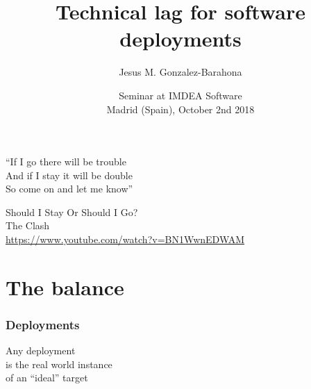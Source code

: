 \documentclass[17pt,aspectratio=169,hyperref=pdfusetitle]{beamer}
\title[Technical lag]{Technical lag for software deployments}
\author[Jesus M. Gonzalez-Barahona]{Jesus M. Gonzalez-Barahona}
\institute[URJC]{Universidad Rey Juan Carlos \\
  @jgbarah ~~~~~ \url{http://github.com/jgbarah/presentations}}
\date[Seminar IMDEA Software ]{Seminar at IMDEA Software \\ Madrid (Spain), October 2nd 2018}
\begin{document}
\begin{frame}
  \maketitle
\end{frame}


\begin{frame}

  {\em
    \begin{center}
      ``If I go there will be trouble \\
      And if I stay it will be double \\
      So come on and let me know''\\
    \end{center}
    \begin{flushright}
      Should I Stay Or Should I Go? \\
      The Clash \\
      \vspace{1cm}
      {\footnotesize
        \url{https://www.youtube.com/watch?v=BN1WwnEDWAM}
      }
    \end{flushright}
  }
\end{frame}





\section{The balance}


\begin{frame}[fragile]
  \frametitle{Deployments}

  {\Large
    Any deployment \\
    is the real world instance \\
    of an ``ideal'' target \\
  }
  
\end{frame}
\end{document}
